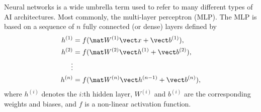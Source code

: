 Neural networks is a wide umbrella term used to refer to many different types of AI architectures. 
Most commonly, the multi-layer perceptron (MLP). 
The MLP is based on a sequence of $n$ fully connected (or dense) layers defined by
\begin{align}
h^{(1)} &= f(\mat W^{(1)} \vect x + \vect b^{(1)}), \\
h^{(2)} &= f(\mat W^{(2)} \vect h^{(1)} + \vect b^{(2)}), \\
\vdots \\
h^{(n)} &= f(\mat W^{(n)} \vect h^{(n-1)} + \vect b^{(n)}),
\end{align}
where $h^{(i)}$ denotes the $i$:th hidden layer, $W^{(i)}$ and $b^{(i)}$ are the corresponding weights and biases, and $f$ is a non-linear activation function.